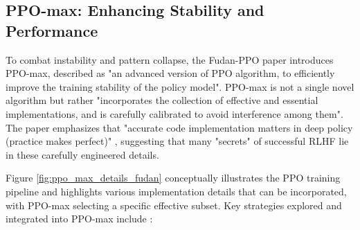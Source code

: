 \documentclass{article} %
\begin{document}

\subsection{PPO-max: Enhancing Stability and Performance}
To combat instability and pattern collapse, the Fudan-PPO paper introduces PPO-max, described as "an advanced version of PPO algorithm, to efficiently improve the training stability of the policy model". \cite{Zheng2023PPO} PPO-max is not a single novel algorithm but rather "incorporates the collection of effective and essential implementations, and is carefully calibrated to avoid interference among them". \cite{Zheng2023PPO} The paper emphasizes that "accurate code implementation matters in deep policy (practice makes perfect)" \cite{Zheng2023PPO}, suggesting that many "secrets" of successful RLHF lie in these carefully engineered details.

Figure \ref{fig:ppo_max_details_fudan} conceptually illustrates the PPO training pipeline and highlights various implementation details that can be incorporated, with PPO-max selecting a specific effective subset. Key strategies explored and integrated into PPO-max include \cite{Zheng2023PPO}:

\end{document}
